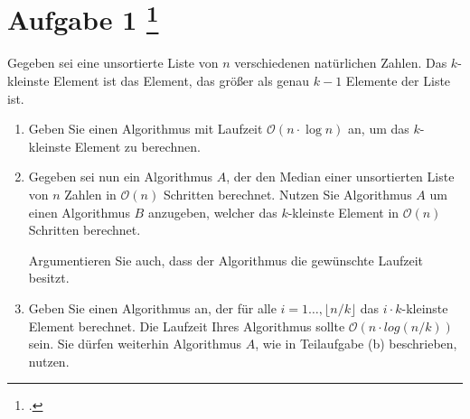 \documentclass{bschlangaul-aufgabe}
\begin{document}
\section{Aufgabe 1
\footcite{examen:66115:2019:03}}

Gegeben sei eine unsortierte Liste von $n$ verschiedenen natürlichen
Zahlen. Das $k$-kleinste Element ist das Element, das größer als genau
$k - 1$ Elemente der Liste ist.

\begin{enumerate}


\item Geben Sie einen Algorithmus mit Laufzeit $\mathcal{O}(n \cdot \log
n)$ an, um das $k$-kleinste Element zu berechnen.

\begin{bAntwort}
\end{bAntwort}


\item Gegeben sei nun ein Algorithmus $A$, der den Median einer
unsortierten Liste von $n$ Zahlen in $\mathcal{O}(n)$ Schritten
berechnet. Nutzen Sie Algorithmus $A$ um einen Algorithmus $B$
anzugeben, welcher das $k$-kleinste Element in $\mathcal{O}(n)$
Schritten berechnet.

Argumentieren Sie auch, dass der Algorithmus die gewünschte Laufzeit
besitzt.

\begin{bAntwort}
\end{bAntwort}


\item  Geben Sie einen Algorithmus an, der für alle $i = 1 \dots,
\lfloor n/k \rfloor$ das $i \cdot k$-kleinste Element berechnet. Die
Laufzeit Ihres Algorithmus sollte $\mathcal{O}(n \cdot log(n/k))$ sein.
Sie dürfen weiterhin Algorithmus $A$, wie in Teilaufgabe (b)
beschrieben, nutzen.

\end{enumerate}
\end{document}

